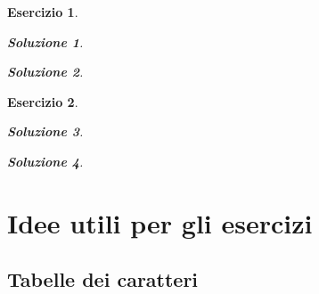 \documentclass[a4paper]{article}
\theoremstyle{break}
\newtheorem{ex}{{ \Large Esercizio} }
\theoremstyle{plain}
\newtheorem{sol}{Soluzione}[ex]
\begin{document}
\begin{ex}


\begin{sol}

\end{sol}

\begin{sol}

\end{sol}


\end{ex}

\begin{ex}


\begin{sol}

\end{sol}

\begin{sol}

\end{sol}


\end{ex}

\newpage
\section*{Idee utili per gli esercizi}
\subsection*{Tabelle dei caratteri}
\end{document}
